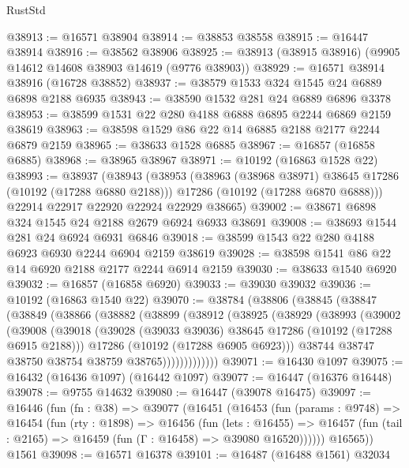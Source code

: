 \begin{lexlean}{RustStd}
\begin{coremodule}
@38913 := @16571 @38904
@38914 := @38853 @38558
@38915 := @16447 @38914
@38916 := @38562 @38906
@38925 := @38913 (@38915 @38916) (@9905 @14612 @14608 @38903 @14619 (@9776 @38903))
@38929 := @16571 @38914 @38916 (@16728 @38852)
@38937 := @38579 @1533 @324 @1545 @24 @6889 @6898 @2188 @6935
@38943 := @38590 @1532 @281 @24 @6889 @6896 @3378
@38953 := @38599 @1531 @22 @280 @4188 @6888 @6895 @2244 @6869 @2159 @38619
@38963 := @38598 @1529 @86 @22 @14 @6885 @2188 @2177 @2244 @6879 @2159
@38965 := @38633 @1528 @6885
@38967 := @16857 (@16858 @6885)
@38968 := @38965 @38967
@38971 := @10192 (@16863 @1528 @22)
@38993 := @38937
    (@38943
      (@38953
        (@38963 (@38968 @38971) @38645 @17286 (@10192 (@17288 @6880 @2188)))
        @17286
        (@10192 (@17288 @6870 @6888)))
      @22914
      @22917
      @22920
      @22924
      @22929
      @38665)
@39002 := @38671 @6898 @324 @1545 @24 @2188 @2679 @6924 @6933 @38691
@39008 := @38693 @1544 @281 @24 @6924 @6931 @6846
@39018 := @38599 @1543 @22 @280 @4188 @6923 @6930 @2244 @6904 @2159 @38619
@39028 := @38598 @1541 @86 @22 @14 @6920 @2188 @2177 @2244 @6914 @2159
@39030 := @38633 @1540 @6920
@39032 := @16857 (@16858 @6920)
@39033 := @39030 @39032
@39036 := @10192 (@16863 @1540 @22)
@39070 := @38784
    (@38806
      (@38845
        (@38847
          (@38849
            (@38866
              (@38882
                (@38899
                  (@38912
                    (@38925
                      (@38929
                        (@38993
                          (@39002
                            (@39008
                              (@39018
                                (@39028 (@39033 @39036) @38645 @17286 (@10192 (@17288 @6915 @2188)))
                                @17286
                                (@10192 (@17288 @6905 @6923)))
                              @38744
                              @38747
                              @38750
                              @38754
                              @38759
                              @38765)))))))))))))
@39071 := @16430 @1097
@39075 := @16432 (@16436 @1097) (@16442 @1097)
@39077 := @16447 (@16376 @16448)
@39078 := @9755 @14632
@39080 := @16447 (@39078 @16475)
@39097 := @16446
    (fun (fn : @38) =>
    @39077
      (@16451
        (@16453
          (fun (params : @9748) =>
          @16454
            (fun (rty : @1898) =>
            @16456
              (fun (lets : @16455) =>
              @16457 (fun (tail : @2165) => @16459 (fun (Γ : @16458) => @39080 @16520))))))
        @16565))
    @1561
@39098 := @16571 @16378
@39101 := @16487 (@16488 @1561) @32034

\end{coremodule}
\end{lexlean}
